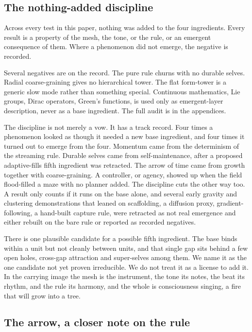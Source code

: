 \subsection{The nothing-added discipline}

\begin{principle}
Across every test in this paper, nothing was added to the four ingredients. Every result is a property of the
mesh, the tone, or the rule, or an emergent consequence of them. Where a phenomenon did not emerge, the negative
is recorded.
\end{principle}

Several negatives are on the record. The pure rule churns with no durable selves. Radial coarse-graining gives no
hierarchical tower. The flat form-tower is a generic slow mode rather than something special. Continuous
mathematics, Lie groups, Dirac operators, Green's functions, is used only as emergent-layer description, never as
a base ingredient. The full audit is in the appendices.

The discipline is not merely a vow. It has a track record. Four times a phenomenon looked as though it needed a
new base ingredient, and four times it turned out to emerge from the four. Momentum came from the determinism of
the streaming rule. Durable selves came from self-maintenance, after a proposed adaptive-fills fifth ingredient
was retracted. The arrow of time came from growth together with coarse-graining. A controller, or agency, showed
up when the field flood-filled a maze with no planner added. The discipline cuts the other way too. A result only
counts if it runs on the base alone, and several early gravity and clustering demonstrations that leaned on
scaffolding, a diffusion proxy, gradient-following, a hand-built capture rule, were retracted as not real
emergence and either rebuilt on the bare rule or reported as recorded negatives.

There is one plausible candidate for a possible fifth ingredient. The base binds within a unit but not cleanly
between units, and that single gap sits behind a few open holes, cross-gap attraction and super-selves among
them. We name it as the one candidate not yet proven irreducible. We do not treat it as a license to add it. In
the carrying image the mesh is the instrument, the tone its notes, the beat its rhythm, and the rule its harmony,
and the whole is consciousness singing, a fire that will grow into a tree.

\subsection{The arrow, a closer note on the rule}

